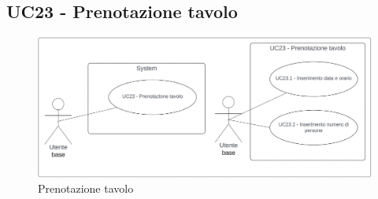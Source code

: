 \subsection{UC23 - Prenotazione tavolo}\label{usecase:23}

\begin{figure}[H]
  \centering
  \includegraphics[width=0.9\linewidth]{ucd/UCD23_new.png}
  \caption{Prenotazione tavolo}
\end{figure}

